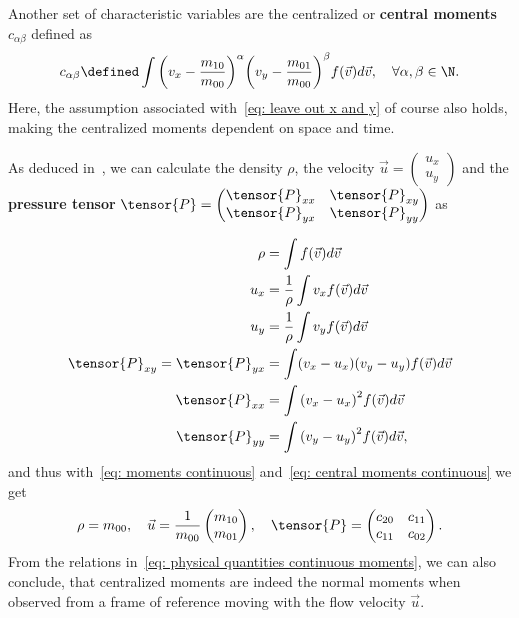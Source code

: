 Another set of characteristic variables are the centralized or \textbf{central moments} $c_{\alpha\beta}$ defined as
\begin{equation}
  \label{eq: central moments continuous}
  c_{\alpha\beta} \defined \int {\left(v_x - \frac{m_{10}}{m_{00}}\right)}^\alpha {\left(v_y-\frac{m_{01}}{m_{00}}\right)}^\beta f(\vec{v})  d\vec{v},\quad\forall\alpha,\beta\in\N.
\end{equation}
Here, the assumption associated with~\eqref{eq: leave out x and y} of course also holds, making the centralized moments dependent on space and time.

As deduced in~\cite[pages 23 ff.]{harris2004introduction}, we can calculate the density $\rho$, the velocity $\vec{u}=\begin{pmatrix}u_x\\u_y\end{pmatrix}$ and the
\textbf{pressure tensor} $\tensor{P}=\begin{pmatrix}\tensor{P}_{xx}&\tensor{P}_{xy}\\ \tensor{P}_{yx}&\tensor{P}_{yy}\end{pmatrix}$ as

\begin{equation}
  \label{eq: physical quantities continuous}
  \begin{aligned}
    \rho & = \int f(\vec{v}) d\vec{v} \\
    u_x
    & = \frac{1}{\rho}\int v_x f(\vec{v}) d\vec{v} \\
    u_y
    & = \frac{1}{\rho}\int v_y f(\vec{v}) d\vec{v}\\
    \tensor{P}_{xy}=\tensor{P}_{yx}
    & = \int (v_x - u_x)(v_y - u_y) f(\vec{v}) d\vec{v} \\
    \tensor{P}_{xx}
    & = \int {(v_x - u_x)}^2 f(\vec{v}) d\vec{v} \\
    \tensor{P}_{yy}
    & = \int {(v_y - u_y)}^2 f(\vec{v}) d\vec{v},
  \end{aligned}
\end{equation}
and thus with~\eqref{eq: moments continuous} and~\eqref{eq: central moments continuous} we get
\begin{equation}
  \label{eq: physical quantities continuous moments}
\rho = m_{00}, \quad \vec{u}=\frac{1}{m_{00}}\begin{pmatrix}m_{10}\\m_{01}\end{pmatrix},\quad \tensor{P}=\begin{pmatrix}c_{20}&c_{11}\\ c_{11}&c_{02}\end{pmatrix}.
\end{equation}
From the relations in~\eqref{eq: physical quantities continuous moments}, we can also conclude, that centralized moments are indeed the normal moments when observed from a frame of reference moving with the flow velocity $\vec{u}$.

